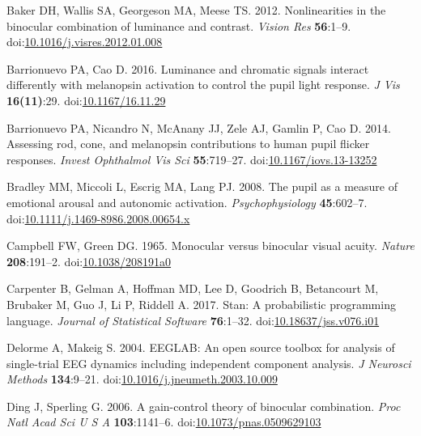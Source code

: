 \documentclass[
]{article}
\newlength{\cslhangindent}
\newlength{\cslentryspacingunit} %
\newenvironment{CSLReferences}[2] %
 {%
  \setlength{\parindent}{0pt}
  \ifodd #1
  \let\oldpar\par
  \def\par{\hangindent=\cslhangindent\oldpar}
  \fi
  \setlength{\parskip}{#2\cslentryspacingunit}
 }%
 {}
\begin{document}
\begin{CSLReferences}{1}{0}
\leavevmode{}%
Baker DH, Wallis SA, Georgeson MA, Meese TS. 2012. Nonlinearities in the binocular combination of luminance and contrast. \emph{Vision Res} \textbf{56}:1--9. doi:\href{https://doi.org/10.1016/j.visres.2012.01.008}{10.1016/j.visres.2012.01.008}

\leavevmode{}%
Barrionuevo PA, Cao D. 2016. Luminance and chromatic signals interact differently with melanopsin activation to control the pupil light response. \emph{J Vis} \textbf{16(11)}:29. doi:\href{https://doi.org/10.1167/16.11.29}{10.1167/16.11.29}

\leavevmode{}%
Barrionuevo PA, Nicandro N, McAnany JJ, Zele AJ, Gamlin P, Cao D. 2014. Assessing rod, cone, and melanopsin contributions to human pupil flicker responses. \emph{Invest Ophthalmol Vis Sci} \textbf{55}:719--27. doi:\href{https://doi.org/10.1167/iovs.13-13252}{10.1167/iovs.13-13252}

\leavevmode{}%
Bradley MM, Miccoli L, Escrig MA, Lang PJ. 2008. The pupil as a measure of emotional arousal and autonomic activation. \emph{Psychophysiology} \textbf{45}:602--7. doi:\href{https://doi.org/10.1111/j.1469-8986.2008.00654.x}{10.1111/j.1469-8986.2008.00654.x}

\leavevmode{}%
Campbell FW, Green DG. 1965. Monocular versus binocular visual acuity. \emph{Nature} \textbf{208}:191--2. doi:\href{https://doi.org/10.1038/208191a0}{10.1038/208191a0}

\leavevmode{}%
Carpenter B, Gelman A, Hoffman MD, Lee D, Goodrich B, Betancourt M, Brubaker M, Guo J, Li P, Riddell A. 2017. Stan: A probabilistic programming language. \emph{Journal of Statistical Software} \textbf{76}:1--32. doi:\href{https://doi.org/10.18637/jss.v076.i01}{10.18637/jss.v076.i01}

\leavevmode{}%
Delorme A, Makeig S. 2004. {EEGLAB}: An open source toolbox for analysis of single-trial {EEG} dynamics including independent component analysis. \emph{J Neurosci Methods} \textbf{134}:9--21. doi:\href{https://doi.org/10.1016/j.jneumeth.2003.10.009}{10.1016/j.jneumeth.2003.10.009}

\leavevmode{}%
Ding J, Sperling G. 2006. A gain-control theory of binocular combination. \emph{Proc Natl Acad Sci U S A} \textbf{103}:1141--6. doi:\href{https://doi.org/10.1073/pnas.0509629103}{10.1073/pnas.0509629103}


\end{CSLReferences}
\end{document}
